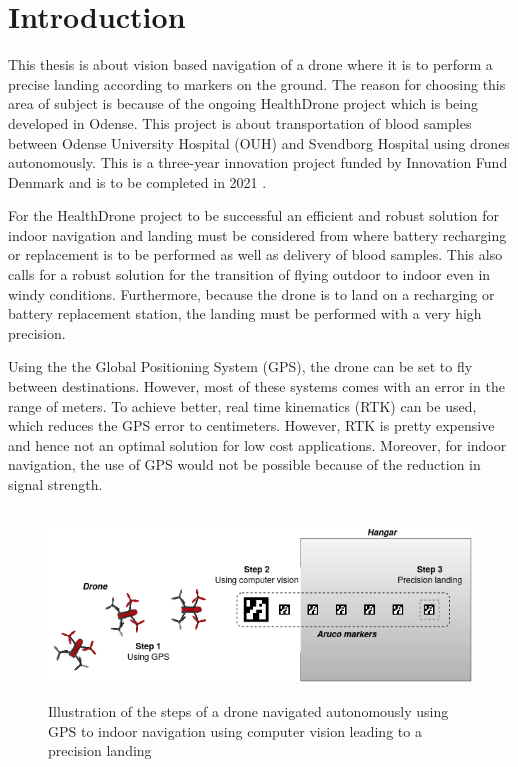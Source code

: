 \documentclass[../Head/Report.tex]{subfiles}
\begin{document}
\section{Introduction}

This thesis is about vision based navigation of a drone where it is to perform a precise landing according to markers on the ground. The reason for choosing this area of subject is because of the ongoing HealthDrone project which is being developed in Odense. This project is about transportation of blood samples between Odense University Hospital (OUH) and Svendborg Hospital using drones autonomously. This is a three-year innovation project funded by Innovation Fund Denmark and is to be completed in 2021 \cite{HealthDrone}.

For the HealthDrone project to be successful an efficient and robust solution for indoor navigation and landing must be considered from where battery recharging or replacement is to be performed as well as delivery of blood samples. This also calls for a robust solution for the transition of flying outdoor to indoor even in windy conditions. Furthermore, because the drone is to land on a recharging or battery replacement station, the landing must be performed with a very high precision.

Using the the Global Positioning System (GPS), the drone can be set to fly between destinations. However, most of these systems comes with an error in the range of meters. To achieve better, real time kinematics (RTK) can be used, which reduces the GPS error to centimeters. However, RTK is pretty expensive and hence not an optimal solution for low cost applications. Moreover, for indoor navigation, the use of GPS would not be possible because of the reduction in signal strength. 

\begin{figure}[H]
	\centering
	\includegraphics[height=5cm]{../Figures/masterProjectIllustration.png}
	\captionsetup{justification=centering}
    \caption{Illustration of the steps of a drone navigated autonomously using GPS to indoor navigation using computer vision leading to a precision landing }
    \label{fig:masterProjectIllustration}
\end{figure}
\end{document}
